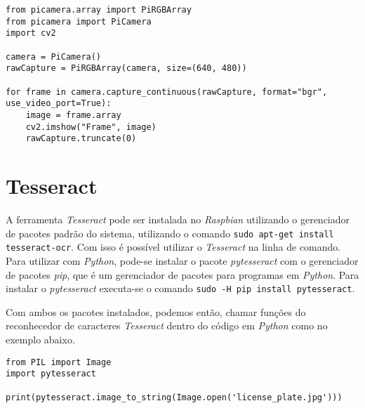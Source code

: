 \begin{verbatim}
from picamera.array import PiRGBArray
from picamera import PiCamera
import cv2
 
camera = PiCamera()
rawCapture = PiRGBArray(camera, size=(640, 480))
 
for frame in camera.capture_continuous(rawCapture, format="bgr", use_video_port=True):
	image = frame.array
	cv2.imshow("Frame", image)
	rawCapture.truncate(0) 
\end{verbatim}


\section{Tesseract}
\label{sec:conftess}

A ferramenta \emph{Tesseract} pode ser instalada no \emph{Raspbian} utilizando o gerenciador de pacotes padrão do sistema, 
utilizando o comando \texttt{sudo apt-get install tesseract-ocr}. Com isso é possível utilizar o \emph{Tesseract} na linha 
de comando. Para utilizar com \emph{Python}, pode-se instalar o pacote \emph{pytesseract} com o gerenciador de pacotes \emph{pip}, 
que é um gerenciador de pacotes para programas em \emph{Python}. Para instalar o \emph{pytesseract} executa-se o comando 
\texttt{sudo -H pip install pytesseract}.

Com ambos os pacotes instalados, podemos então, chamar funções do reconhecedor de caracteres \emph{Tesseract} dentro 
do código em \emph{Python} como no exemplo abaixo.

\begin{verbatim}
from PIL import Image
import pytesseract

print(pytesseract.image_to_string(Image.open('license_plate.jpg')))
\end{verbatim}
